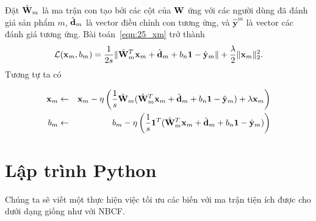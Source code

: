 Đặt $\hat{\mathbf{W}}_m$ là ma trận con tạo bởi các cột của $\mathbf{W}$ ứng
với các người dùng đã đánh giá sản phẩm $m$, $\hat{\mathbf{d}}_m$ là vector điều chỉnh con
tương ứng, và $\hat{\mathbf{y}}^m$ là vector các đánh giá tương ứng. Bài
toán~\eqref{eqn:25_xm} trở thành
\begin{equation}
\mathcal{L}(\mathbf{x}_m, b_m)
= \frac{1}{2s}\|\hat{\mathbf{W}}_m^T\mathbf{x}_m + \hat{\mathbf{d}}_m + b_n\mathbf{1} - \hat{\mathbf{y}}_m \| +
\frac{\lambda}{2}\|\mathbf{x}_m\|_2^2.
\end{equation}
Tương tự ta có

\begin{eqnarray}
\mathbf{x}_m &\leftarrow & \mathbf{x}_m -
\eta\left(\frac{1}{s}\hat{\mathbf{W}}_m(\hat{\mathbf{W}}_m^T\mathbf{x}_m + \hat{\mathbf{d}}_m +
b_n\mathbf{1} - \hat{\mathbf{y}}_m) + \lambda\mathbf{x}_m\right) \\
b_m &\leftarrow& b_m - \eta\left(\frac{1}{s}\mathbf{1}^T(\hat{\mathbf{W}}_m^T\mathbf{x}_m + \hat{\mathbf{d}}_m +
b_n\mathbf{1} - \hat{\mathbf{y}}_m)\right)
\end{eqnarray}

\section{Lập trình Python }
Chúng ta sẽ viết một  thực hiện việc tối ưu
các biến với ma trận tiện ích được cho dưới dạng  giống
như với NBCF.


